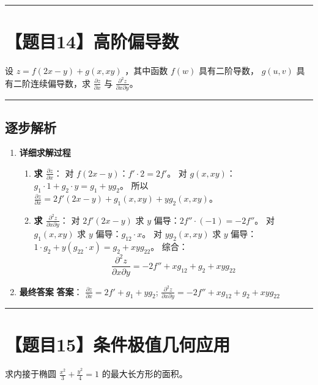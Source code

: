 \documentclass[UTF8]{ctexart}
\newenvironment{redenv}{\color{red}}{}
\newenvironment{detailedanalysis}{%
    \color{red}
    \begin{enumerate}[label=\textbf{第\arabic*步：}, leftmargin=*, align=left, itemsep=1.5ex]
}{%
    \end{enumerate}
}
\newcommand{\problemrule}{\noindent\rule{\textwidth}{1.5pt}\vspace{-0.8em}}
\newcommand{\analysisrule}{\noindent\rule{\textwidth}{0.8pt}\vspace{-0.8em}}
\begin{document}
\problemrule
\section*{【题目14】高阶偏导数}
设 $ z = f(2x - y) + g(x, xy) $ ，其中函数 $ f(w) $ 具有二阶导数， $ g(u, v) $ 具有二阶连续偏导数，求 $ \frac{\partial z}{\partial x} $ 与 $ \frac{\partial^{2}z}{\partial x \partial y} $。

\begin{redenv}
\analysisrule
\subsection*{逐步解析}

\begin{detailedanalysis}
\item \textbf{详细求解过程}
\begin{enumerate}[label=(\arabic*)]
\item \textbf{求 $\frac{\partial z}{\partial x}$}：
对 $f(2x-y)$：$f' \cdot 2 = 2f'$。
对 $g(x, xy)$：$g_1 \cdot 1 + g_2 \cdot y = g_1 + y g_2$。
所以 $\frac{\partial z}{\partial x} = 2f'(2x-y) + g_1(x, xy) + y g_2(x, xy)$。
\item \textbf{求 $\frac{\partial^2 z}{\partial x \partial y}$}：
对 $2f'(2x-y)$ 求 $y$ 偏导：$2f'' \cdot (-1) = -2f''$。
对 $g_1(x, xy)$ 求 $y$ 偏导：$g_{12} \cdot x$。
对 $y g_2(x, xy)$ 求 $y$ 偏导：$1 \cdot g_2 + y(g_{22} \cdot x) = g_2 + xy g_{22}$。
综合：
$$ \frac{\partial^2 z}{\partial x \partial y} = -2f'' + x g_{12} + g_2 + xy g_{22} $$
\end{enumerate}

\item \textbf{最终答案}
\textbf{答案}：
$ \frac{\partial z}{\partial x} = 2f' + g_1 + y g_2 $;
$ \frac{\partial^{2}z}{\partial x \partial y} = -2f'' + x g_{12} + g_2 + xy g_{22} $
\end{detailedanalysis}
\end{redenv}

\problemrule
\section*{【题目15】条件极值几何应用}
求内接于椭圆 $ \frac{x^{2}}{3}+\frac{y^{2}}{4}=1 $ 的最大长方形的面积。
\end{document}

